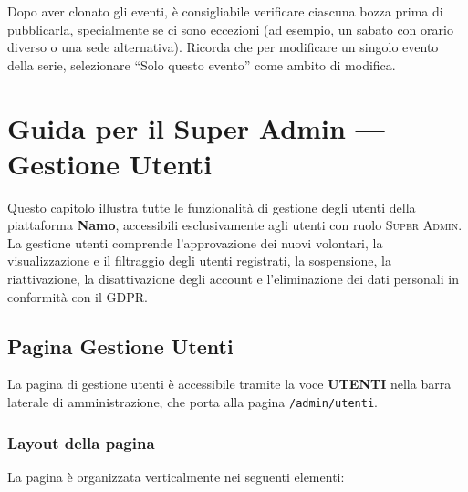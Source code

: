 \documentclass[a4paper,11pt,oneside]{book}
\newcommand{\namo}{\textbf{Namo}}
\newcommand{\menuitem}[1]{\textsf{\textbf{#1}}}
\newcommand{\percorso}[1]{\textcolor{namoCyan}{\texttt{#1}}}
\newcommand{\ruolo}[1]{\textsc{#1}}
\begin{document}
\begin{tipbox}
Dopo aver clonato gli eventi, \`e consigliabile verificare ciascuna bozza prima di pubblicarla, specialmente se ci sono eccezioni (ad esempio, un sabato con orario diverso o una sede alternativa). Ricorda che per modificare un singolo evento della serie, selezionare ``Solo questo evento'' come ambito di modifica.
\end{tipbox}


\chapter{Guida per il Super Admin --- Gestione Utenti}
\label{ch:admin-utenti}

Questo capitolo illustra tutte le funzionalit\`a di gestione degli utenti della piattaforma \namo{}, accessibili esclusivamente agli utenti con ruolo \ruolo{Super Admin}. La gestione utenti comprende l'approvazione dei nuovi volontari, la visualizzazione e il filtraggio degli utenti registrati, la sospensione, la riattivazione, la disattivazione degli account e l'eliminazione dei dati personali in conformit\`a con il GDPR.

\section{Pagina Gestione Utenti}
\label{sec:pagina-gestione-utenti}

La pagina di gestione utenti \`e accessibile tramite la voce \menuitem{UTENTI} nella barra laterale di amministrazione, che porta alla pagina \percorso{/admin/utenti}.

\subsection{Layout della pagina}

La pagina \`e organizzata verticalmente nei seguenti elementi:
\end{document}
